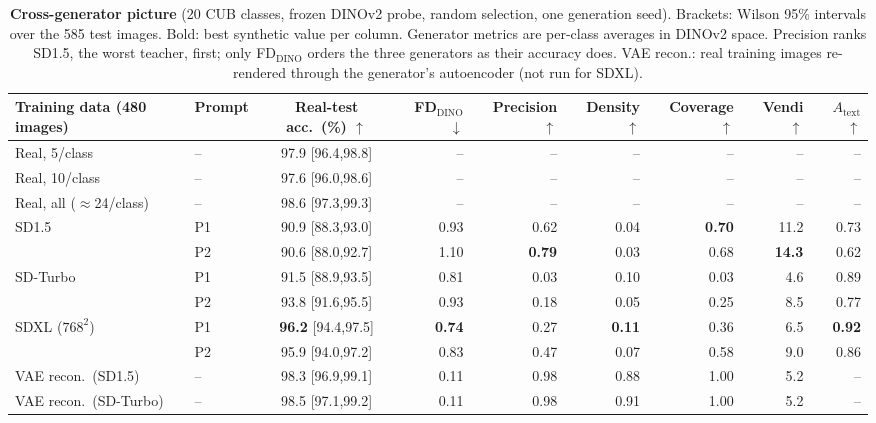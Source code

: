 \begin{table}[t]
\centering\small
\setlength{\tabcolsep}{2.5pt}
\begin{tabular}{@{}llcrrrrrr@{}}
\toprule
Training data (480 images) & Prompt & Real-test acc.\ (\%) $\uparrow$ & FD$_\text{DINO}$ $\downarrow$ & Precision $\uparrow$ & Density $\uparrow$ & Coverage $\uparrow$ & Vendi $\uparrow$ & $A_\text{text}$ $\uparrow$ \\
\midrule
Real, 5/class & -- & 97.9 [96.4,98.8] & -- & -- & -- & -- & -- & -- \\
Real, 10/class & -- & 97.6 [96.0,98.6] & -- & -- & -- & -- & -- & -- \\
Real, all ($\approx$24/class) & -- & 98.6 [97.3,99.3] & -- & -- & -- & -- & -- & -- \\
\midrule
SD1.5 & P1 & 90.9 [88.3,93.0] & 0.93 & 0.62 & 0.04 & \textbf{0.70} & 11.2 & 0.73 \\
 & P2 & 90.6 [88.0,92.7] & 1.10 & \textbf{0.79} & 0.03 & 0.68 & \textbf{14.3} & 0.62 \\
\midrule
SD-Turbo & P1 & 91.5 [88.9,93.5] & 0.81 & 0.03 & 0.10 & 0.03 & 4.6 & 0.89 \\
 & P2 & 93.8 [91.6,95.5] & 0.93 & 0.18 & 0.05 & 0.25 & 8.5 & 0.77 \\
\midrule
SDXL ($768^2$) & P1 & \textbf{96.2} [94.4,97.5] & \textbf{0.74} & 0.27 & \textbf{0.11} & 0.36 & 6.5 & \textbf{0.92} \\
 & P2 & 95.9 [94.0,97.2] & 0.83 & 0.47 & 0.07 & 0.58 & 9.0 & 0.86 \\
\midrule
VAE recon.\ (SD1.5) & -- & 98.3 [96.9,99.1] & 0.11 & 0.98 & 0.88 & 1.00 & 5.2 & -- \\
VAE recon.\ (SD-Turbo) & -- & 98.5 [97.1,99.2] & 0.11 & 0.98 & 0.91 & 1.00 & 5.2 & -- \\
\bottomrule
\end{tabular}
\caption{\textbf{Cross-generator picture} (20 CUB classes, frozen DINOv2 probe, random selection, one generation seed). Brackets: Wilson 95\% intervals over the 585 test images. Bold: best synthetic value per column. Generator metrics are per-class averages in DINOv2 space. Precision ranks SD1.5, the worst teacher, first; only FD$_\text{DINO}$ orders the three generators as their accuracy does. VAE recon.: real training images re-rendered through the generator's autoencoder (not run for SDXL).}
\label{tab:main}
\end{table}
